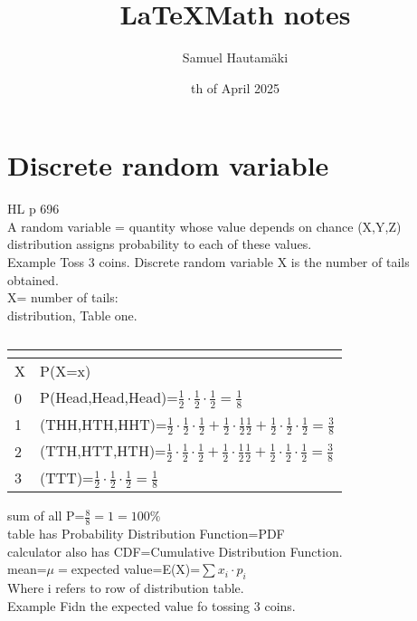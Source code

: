 \documentclass{article}
\title{\LaTeX Math notes}
\author{Samuel Hautamäki}
\date{th of April 2025}
\begin{document}
  \maketitle
   
  \section{Discrete random variable}
  HL p 696\\
  A random variable = quantity whose value depends on chance (X,Y,Z)\\
  distribution assigns probability to each of these values.\\
  Example Toss 3 coins. Discrete random variable X is the number of tails obtained.\\
  X= number of tails:\\
  distribution, Table one.\\
  \begin{table}
    \caption{}\label{tab:}
      \begin{tabular}[c]{l|l}
        \hline
        \multicolumn{1}{c|}{\textbf{}} & 
        \multicolumn{1}{c}{\textbf{}} \\
        \hline
        X & P(X=x) \\
        0 & P(Head,Head,Head)=$\frac{1}{2}\cdot\frac{1}{2}\cdot\frac{1}{2}=\frac{1}{8}$ \\
        1 & (THH,HTH,HHT)=$\frac{1}{2}\cdot\frac{1}{2}\cdot\frac{1}{2}+\frac{1}{2}\cdot\frac{1}{2}\frac{1}{2}+\frac{1}{2}\cdot\frac{1}{2}\cdot\frac{1}{2}=\frac{3}{8}$ \\
        2 & (TTH,HTT,HTH)=$\frac{1}{2}\cdot\frac{1}{2}\cdot\frac{1}{2}+\frac{1}{2}\cdot\frac{1}{2}\frac{1}{2}+\frac{1}{2}\cdot\frac{1}{2}\cdot\frac{1}{2}=\frac{3}{8}$\\
        3 & (TTT)=$\frac{1}{2}\cdot\frac{1}{2}\cdot\frac{1}{2}=\frac{1}{8}$ \\
        \hline
      \end{tabular}
  \end{table}
  sum of all P=$\frac{8}{8}=1=100\%$\\
  table has Probability Distribution Function=PDF\\
  calculator also has CDF=Cumulative Distribution Function.\\
  mean=$\mu=$expected value=E(X)=$\sum x_i\cdot p_i$\\
  Where i refers to row of distribution table.\\
  Example Fidn the expected value fo tossing 3 coins.\\
\end{document}
